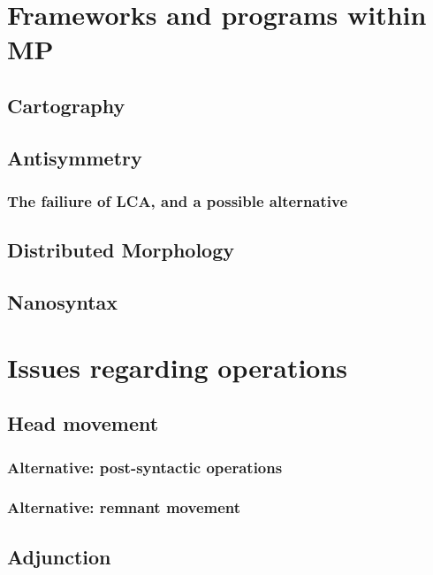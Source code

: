\documentclass[a4paper]{article}
\begin{document}
\section{Frameworks and programs within MP}\label{sec:framework}

\subsection{Cartography}

\subsection{Antisymmetry}

\subsubsection{The failiure of LCA, and a possible alternative}

\subsection{Distributed Morphology}

\subsection{Nanosyntax}

\section{Issues regarding operations}\label{sec:issue-op}

\subsection{Head movement}


\subsubsection{Alternative: post-syntactic operations}

\subsubsection{Alternative: remnant movement}

\subsection{Adjunction}
\end{document}
